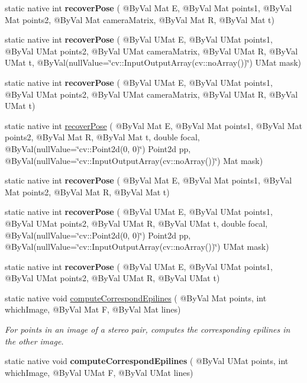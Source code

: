 \begin{DoxyCompactItemize}
static native int {\bfseries recover\+Pose} ( @By\+Val Mat E, @By\+Val Mat points1, @By\+Val Mat points2, @By\+Val Mat camera\+Matrix, @By\+Val Mat R, @By\+Val Mat t)
\item 
static native int {\bfseries recover\+Pose} ( @By\+Val U\+Mat E, @By\+Val U\+Mat points1, @By\+Val U\+Mat points2, @By\+Val U\+Mat camera\+Matrix, @By\+Val U\+Mat R, @By\+Val U\+Mat t, @By\+Val(null\+Value=\char`\"{}cv\+::\+Input\+Output\+Array(cv\+::no\+Array())\char`\"{}) U\+Mat mask)
\item 
static native int {\bfseries recover\+Pose} ( @By\+Val U\+Mat E, @By\+Val U\+Mat points1, @By\+Val U\+Mat points2, @By\+Val U\+Mat camera\+Matrix, @By\+Val U\+Mat R, @By\+Val U\+Mat t)
\item 
static native int \hyperlink{group__calib3d_gaf6412b75e2ce96f4461d17a09c09c8b9}{recover\+Pose} ( @By\+Val Mat E, @By\+Val Mat points1, @By\+Val Mat points2, @By\+Val Mat R, @By\+Val Mat t, double focal, @By\+Val(null\+Value=\char`\"{}cv\+::\+Point2d(0, 0)\char`\"{}) Point2d pp, @By\+Val(null\+Value=\char`\"{}cv\+::\+Input\+Output\+Array(cv\+::no\+Array())\char`\"{}) Mat mask)
\item 
static native int {\bfseries recover\+Pose} ( @By\+Val Mat E, @By\+Val Mat points1, @By\+Val Mat points2, @By\+Val Mat R, @By\+Val Mat t)
\item 
static native int {\bfseries recover\+Pose} ( @By\+Val U\+Mat E, @By\+Val U\+Mat points1, @By\+Val U\+Mat points2, @By\+Val U\+Mat R, @By\+Val U\+Mat t, double focal, @By\+Val(null\+Value=\char`\"{}cv\+::\+Point2d(0, 0)\char`\"{}) Point2d pp, @By\+Val(null\+Value=\char`\"{}cv\+::\+Input\+Output\+Array(cv\+::no\+Array())\char`\"{}) U\+Mat mask)
\item 
static native int {\bfseries recover\+Pose} ( @By\+Val U\+Mat E, @By\+Val U\+Mat points1, @By\+Val U\+Mat points2, @By\+Val U\+Mat R, @By\+Val U\+Mat t)
\item 
static native void \hyperlink{group__calib3d_ga7bf6bd2c5ee1b9d403fb85aa5dec095f}{compute\+Correspond\+Epilines} ( @By\+Val Mat points, int which\+Image, @By\+Val Mat F, @By\+Val Mat lines)
\begin{DoxyCompactList}\small\item\em For points in an image of a stereo pair, computes the corresponding epilines in the other image. \end{DoxyCompactList}\item 
static native void {\bfseries compute\+Correspond\+Epilines} ( @By\+Val U\+Mat points, int which\+Image, @By\+Val U\+Mat F, @By\+Val U\+Mat lines)

\end{DoxyCompactItemize}
